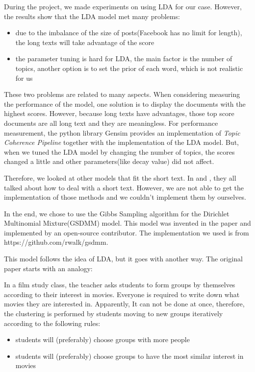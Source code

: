 \documentclass[sigchi]{acmart}
\begin{document}
During the project, we made experiments on using LDA for our case. However, the results show that the LDA model met many problems:
\begin{itemize}
    \item due to the imbalance of the size of posts(Facebook has no limit for length), the long texts will take advantage of the score
    \item the parameter tuning is hard for LDA, the main factor is the number of topics, another option is to set the prior of each word, which is not realistic for us
\end{itemize}

These two problems are related to many aspects. When considering measuring the performance of the model, one solution is to display the documents with the highest scores. However, because long texts have advantages, those top score documents are all long text and they are meaningless. For performance measurement, the python library Gensim provides an implementation of \textit{Topic Coherence Pipeline}\cite{roderexploring} together with the implementation of the LDA model. But, when we tuned the LDA model by changing the number of topics, the scores changed a little and other parameters(like decay value) did not affect.

Therefore, we looked at other models that fit the short text. In \cite{RangarajanSridhar2015} and \cite{Padmakumar2017}, they all talked about how to deal with a short text. However, we are not able to get the implementation of those methods and we couldn't implement them by ourselves.

In the end, we chose to use the Gibbs Sampling algorithm for the Dirichlet Multinomial Mixture(GSDMM) model. This model was invented in the paper \cite{wang2014dirichlet} and implemented by an open-source contributor. The implementation we used is from https://github.com/rwalk/gsdmm.

This model follows the idea of LDA, but it goes with another way. The original paper starts with an analogy:

In a film study class, the teacher asks students to form groups by themselves according to their interest in movies. Everyone is required to write down what movies they are interested in. Apparently, It can not be done at once, therefore, the clustering is performed by students moving to new groups iteratively according to the following rules:
\begin{itemize}
    \item students will (preferably) choose groups with more people
    \item students will (preferably) choose groups to have the most similar interest in movies
\end{itemize}
\end{document}
